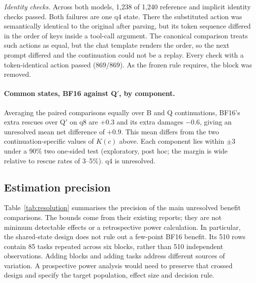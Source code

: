 \emph{Identity checks.} Across both models, 1{,}238 of 1{,}240 reference and implicit identity checks passed. Both failures are one q4 state. There the substituted action was semantically identical to the original after parsing, but its token sequence differed in the order of keys inside a tool-call argument. The canonical comparison treats such actions as equal, but the chat template renders the order, so the next prompt differed and the continuation could not be a replay. Every check with a token-identical action passed (869/869). As the frozen rule requires, the block was removed. %

\paragraph{Common states, BF16 against Q$'$, by component.} Averaging the paired comparisons equally over B and Q continuations, BF16's extra rescues over Q$'$ on q8 are $+0.3$\pp{} and its extra damages $-0.6$\pp{}, giving an unresolved mean net difference of $+0.9$\pp{}. This mean differs from the two continuation-specific values of $K(c)$ above. Each component lies within $\pm$3\pp{} under a 90\% two one-sided test (exploratory, post hoc; the margin is wide relative to rescue rates of 3--5\%). q4 is unresolved. %


\subsection{Estimation precision}
\label{app:resolution}

Table~\ref{tab:resolution} summarises the precision of the main unresolved benefit comparisons. The bounds come from their existing reports; they are not minimum detectable effects or a retrospective power calculation. In particular, the shared-state design does not rule out a few-point BF16 benefit. Its 510 rows contain 85 tasks repeated across six blocks, rather than 510 independent observations. Adding blocks and adding tasks address different sources of variation. A prospective power analysis would need to preserve that crossed design and specify the target population, effect size and decision rule.


